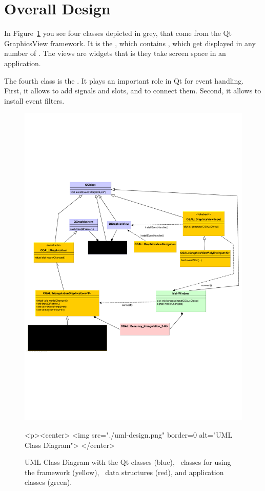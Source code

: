 \section{Overall Design}

In Figure~\ref{graphicsview:uml} you see four classes depicted in grey,
that come from the Qt GraphicsView framework. It is the ,
which contains , which get displayed in any number
of .   The views are widgets that is they take screen space
in an application.   

The fourth class is the . It plays an important role in Qt for
event handling. First, it allows to add signals and slots, and to connect them.
Second, it allows to install event filters. 


\begin{figure}[t]
\begin{ccTexOnly}
  \begin{center}
  \includegraphics[width=\linewidth]{GraphicsView/uml-design}
  \end{center}
\end{ccTexOnly}
\begin{ccHtmlOnly}
  <p><center>
  <img src="./uml-design.png" border=0 alt="UML Class Diagram">
  </center>
\end{ccHtmlOnly}
\caption{UML Class Diagram with the Qt classes (blue), \cgal\ classes for using the framework (yellow),
\cgal\ data structures (red), and application classes (green). \label{graphicsview:uml}}
\end{figure}

